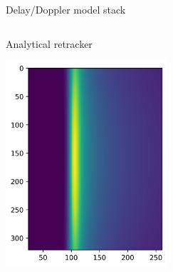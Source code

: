\documentclass[compress,8pt]{beamer}
\begin{document}
\begin{frame}{Delay/Doppler model stack}
\begin{columns}
\begin{column}{0.45\textwidth}
Analytical retracker

\includegraphics[width=0.45\textwidth]{fig/stack_dc_ana} 
  
\end{column}
\end{columns}

\end{frame}
\end{document}
